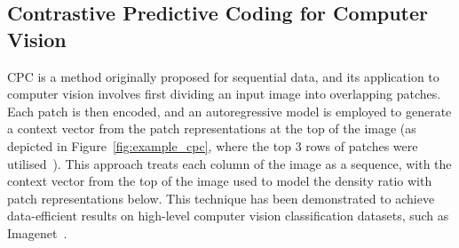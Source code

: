 \subsection{Contrastive Predictive Coding for Computer Vision}
\label{subsec:unsupervised_cpc_for_vision}
CPC is a method originally proposed for sequential data, and its application to computer vision involves first dividing an input image into overlapping patches. Each patch is then encoded, and an autoregressive model is employed to generate a context vector from the patch representations at the top of the image (as depicted in Figure~\ref{fig:example_cpc}, where the top 3 rows of patches were utilised~\citep{oord2018representation}). This approach treats each column of the image as a sequence, with the context vector from the top of the image used to model the density ratio with patch representations below. This technique has been demonstrated to achieve data-efficient results on high-level computer vision classification datasets, such as Imagenet~\citep{deng2009imagenet}.

